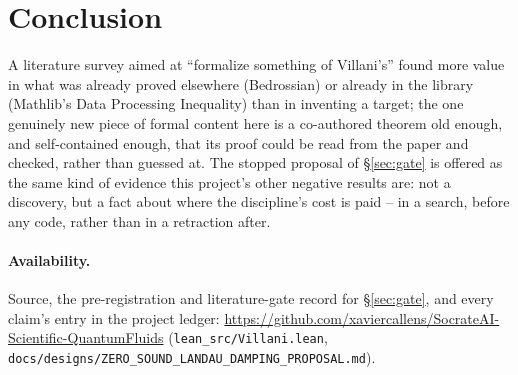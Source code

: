 \documentclass[11pt,a4paper]{article}
\newcommand{\lean}[1]{\texttt{\small #1}}
\begin{document}
\section{Conclusion}

A literature survey aimed at ``formalize something of Villani's'' found more value in what was already
proved elsewhere (Bedrossian) or already in the library (Mathlib's Data Processing Inequality) than in
inventing a target; the one genuinely new piece of formal content here is a co-authored theorem old
enough, and self-contained enough, that its proof could be read from the paper and checked, rather than
guessed at. The stopped proposal of \S\ref{sec:gate} is offered as the same kind of evidence this
project's other negative results are: not a discovery, but a fact about where the discipline's cost is
paid -- in a search, before any code, rather than in a retraction after.

\paragraph{Availability.} Source, the pre-registration and literature-gate record for
\S\ref{sec:gate}, and every claim's entry in the project ledger:
\url{https://github.com/xaviercallens/SocrateAI-Scientific-QuantumFluids}
(\lean{lean\_src/Villani.lean}, \texttt{docs/designs/ZERO\_SOUND\_LANDAU\_DAMPING\_PROPOSAL.md}).



\end{document}
